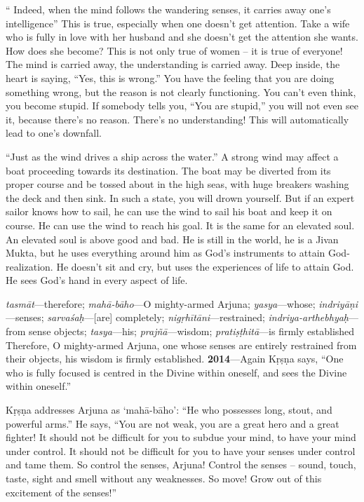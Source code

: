 “ Indeed, when the mind follows the wandering senses, it carries away one’s intelligence” This is true, especially when one doesn’t get attention. Take a wife who is fully in love with her husband and she doesn’t get the attention she wants. How does she become? This is not only true of women – it is true of everyone! The mind is carried away, the understanding is carried away. Deep inside, the heart is saying, “Yes, this is wrong.” You have the feeling that you are doing something wrong, but the reason is not clearly functioning. You can’t even think, you become stupid. If somebody tells you, “You are stupid,” you will not even see it, because there’s no reason. There’s no understanding! This will automatically lead to one’s downfall.

“Just as the wind drives a ship across the water.” A strong wind may affect a boat proceeding towards its destination. The boat may be diverted from its proper course and be tossed about in the high seas, with huge breakers washing the deck and then sink. In such a state, you will drown yourself. But if an expert sailor knows how to sail, he can use the wind to sail his boat and keep it on course. He can use the wind to reach his goal. It is the same for an elevated soul. An elevated soul is above good and bad. He is still in the world, he is a Jivan Mukta, but he uses everything around him as God’s instruments to attain God-realization. He doesn’t sit and cry, but uses the experiences of life to attain God. He sees God’s hand in every aspect of life.

{%
  \textit{tasmāt}---therefore; 
  \textit{mahā-bāho}---O mighty-armed Arjuna; 
  \textit{yasya}---whose; 
  \textit{indriyāṇi}---senses; 
  \textit{sarvaśaḥ}---[are] completely; 
  \textit{nigṛhītāni}---restrained; 
  \textit{indriya-arthebhyaḥ}---from sense objects; 
  \textit{tasya}---his; 
  \textit{prajñā}---wisdom; 
  \textit{pratiṣṭhitā}---is firmly established
}
{%
  Therefore, O mighty-armed Arjuna, one whose senses are entirely restrained from their objects, his wisdom is firmly established.
}
\textbf{2014}---Again Kṛṣṇa says, “One who is fully focused is centred in the Divine within oneself, and sees the Divine within oneself.”

Kṛṣṇa addresses Arjuna as ‘mahā-bāho’: “He who possesses long, stout, and powerful arms.” He says, “You are not weak, you are a great hero and a great fighter! It should not be difficult for you to subdue your mind, to have your mind under control. It should not be difficult for you to have your senses under control and tame them. So control the senses, Arjuna! Control the senses – sound, touch, taste, sight and smell without any weaknesses. So move! Grow out of this excitement of the senses!”

